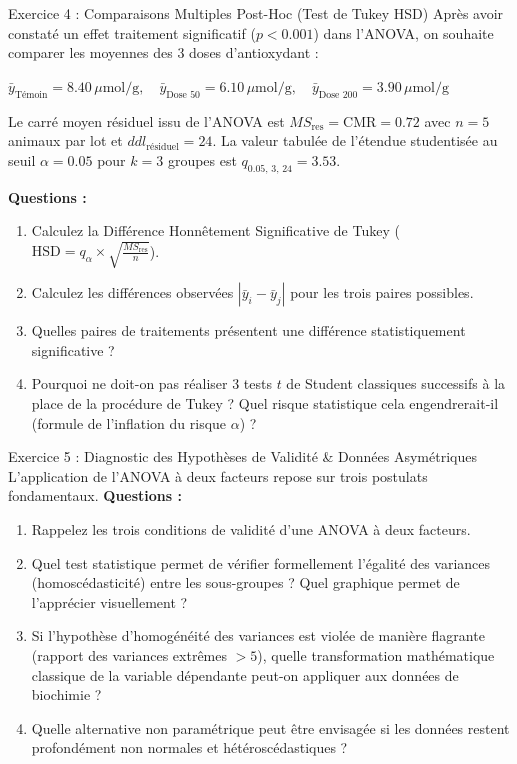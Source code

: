 \documentclass[11pt,a4paper]{article}
\begin{document}
\begin{exercicebox}{Exercice 4 : Comparaisons Multiples Post-Hoc (Test de Tukey HSD)}
Après avoir constaté un effet traitement significatif ($p < 0.001$) dans l'ANOVA, on souhaite comparer les moyennes des 3 doses d'antioxydant :
\begin{center}
  $\bar{y}_{\text{Témoin}} = 8.40\,\mu\text{mol/g}, \quad \bar{y}_{\text{Dose 50}} = 6.10\,\mu\text{mol/g}, \quad \bar{y}_{\text{Dose 200}} = 3.90\,\mu\text{mol/g}$
\end{center}
Le carré moyen résiduel issu de l'ANOVA est $MS_{\text{res}} = \text{CMR} = 0.72$ avec $n = 5$ animaux par lot et $ddl_{\text{résiduel}} = 24$.
La valeur tabulée de l'étendue studentisée au seuil $\alpha = 0.05$ pour $k = 3$ groupes est $q_{0.05, \, 3, \, 24} = 3.53$.

\textbf{Questions :}
\begin{enumerate}[label=\textbf{\alph*.}]
  \item Calculez la Différence Honnêtement Significative de Tukey ($\text{HSD} = q_{\alpha} \times \sqrt{\frac{MS_{\text{res}}}{n}}$).
  \item Calculez les différences observées $|\bar{y}_i - \bar{y}_j|$ pour les trois paires possibles.
  \item Quelles paires de traitements présentent une différence statistiquement significative ?
  \item Pourquoi ne doit-on pas réaliser 3 tests $t$ de Student classiques successifs à la place de la procédure de Tukey ? Quel risque statistique cela engendrerait-il (formule de l'inflation du risque $\alpha$) ?
\end{enumerate}
\end{exercicebox}

\begin{exercicebox}{Exercice 5 : Diagnostic des Hypothèses de Validité \& Données Asymétriques}
L'application de l'ANOVA à deux facteurs repose sur trois postulats fondamentaux.
\textbf{Questions :}
\begin{enumerate}[label=\textbf{\alph*.}]
  \item Rappelez les trois conditions de validité d'une ANOVA à deux facteurs.
  \item Quel test statistique permet de vérifier formellement l'égalité des variances (homoscédasticité) entre les sous-groupes ? Quel graphique permet de l'apprécier visuellement ?
  \item Si l'hypothèse d'homogénéité des variances est violée de manière flagrante (rapport des variances extrêmes $> 5$), quelle transformation mathématique classique de la variable dépendante peut-on appliquer aux données de biochimie ?
  \item Quelle alternative non paramétrique peut être envisagée si les données restent profondément non normales et hétéroscédastiques ?
\end{enumerate}
\end{exercicebox}
\end{document}
